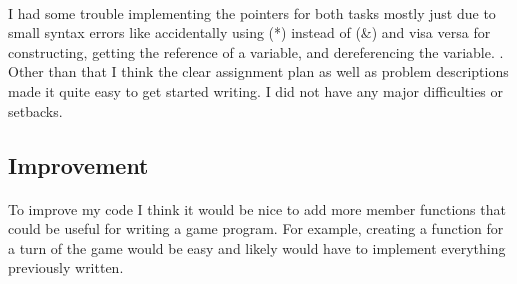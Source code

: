 \documentclass[a4paper, 11pt]{article}
\begin{document}
	\paragraph{}
	I had some trouble implementing the pointers for both tasks mostly just due to small syntax errors like accidentally using (*) instead of (\&) and visa versa for constructing, getting the reference of a variable, and dereferencing the variable. .  Other than that I think the clear assignment plan as well as problem descriptions made it quite easy to get started writing. I did not have any major difficulties or setbacks. 
\subsection*{Improvement} 
	\paragraph{} 
	To improve my code I think it would be nice to add more member functions that could be useful for writing a game program. For example, creating a function for a turn of the game would be easy and likely would have to implement everything previously written. 
	

		
\end{document}
